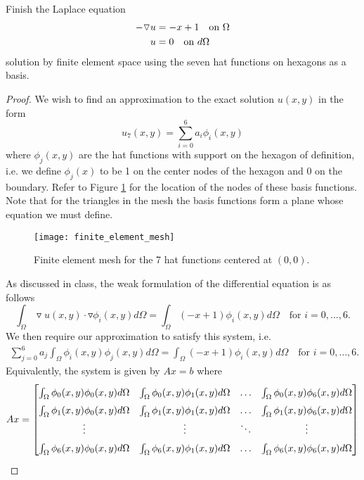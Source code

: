 \begin{problem}
  Finish the Laplace equation
  \begin{align}\label{laplace}
    -\triangledown u &= -x + 1 \quad \text{on $\Omega$} \notag \\
    u &= 0 \quad \text{on $d\Omega$}
  \end{align}
  solution by finite element
  space using the seven hat functions on hexagons as a basis.
\end{problem}

\begin{proof}
  We wish to find an approximation to the exact solution $u(x, y)$ in the form
  \[
    u_7(x, y) = \sum_{i=0}^6 a_i \phi_i(x, y)
  \]
  where $\phi_j(x, y)$ are the hat functions with support on the hexagon of definition, i.e.
  we define $\phi_j(x)$ to be 1 on the center nodes of the hexagon and 0 on the boundary.
  Refer to Figure \ref{mesh} for the location of the nodes of these basis functions.
  Note that for the triangles in the mesh the basis functions form a plane whose equation we must define.

  \begin{figure}[h!]
    \begin{center}
      \texttt{[image: finite\_element\_mesh]}
    \end{center}
    \caption{Finite element mesh for the 7 hat functions centered at $(0, 0)$.}\label{mesh}
  \end{figure}

  As discussed in class, the weak formulation of the differential equation
  \label{laplace} is as follows
  \[
    \int_\Omega \triangledown u(x, y) \cdot \triangledown\phi_i(x, y) d\Omega = \int_\Omega (-x + 1)\phi_i(x, y)d\Omega \quad \text{for $i=0,\dots,6$}.
  \]
  We then require our approximation to satisfy this system, i.e.\
  \begin{align}\label{laplace_system}
    \sum_{j=0}^6 a_j \int_\Omega \phi_i(x, y) \phi_j(x, y) d\Omega = \int_\Omega (-x + 1)\phi_i(x, y)d\Omega \quad \text{for $i=0,\dots,6$}.
  \end{align}
  Equivalently, the system is given by $Ax = b$ where
  \[
    Ax =
    \renewcommand\arraystretch{1.5}
    \begin{bmatrix}
      \int_\Omega \phi_0(x,y)\phi_0(x,y) d\Omega & \int_\Omega \phi_0(x,y)\phi_1(x,y) d\Omega & \hdots & \int_\Omega \phi_0(x,y)\phi_6(x,y) d\Omega \\
      \int_\Omega \phi_1(x,y)\phi_0(x,y) d\Omega & \int_\Omega \phi_1(x,y)\phi_1(x,y) d\Omega & \hdots & \int_\Omega \phi_1(x,y)\phi_6(x,y) d\Omega \\
      \vdots & \vdots & \ddots & \vdots \\
      \int_\Omega \phi_6(x,y)\phi_0(x,y) d\Omega & \int_\Omega \phi_6(x,y)\phi_1(x,y) d\Omega & \hdots & \int_\Omega \phi_6(x,y)\phi_6(x,y) d\Omega \\


\end{bmatrix}\]
\end{proof}
